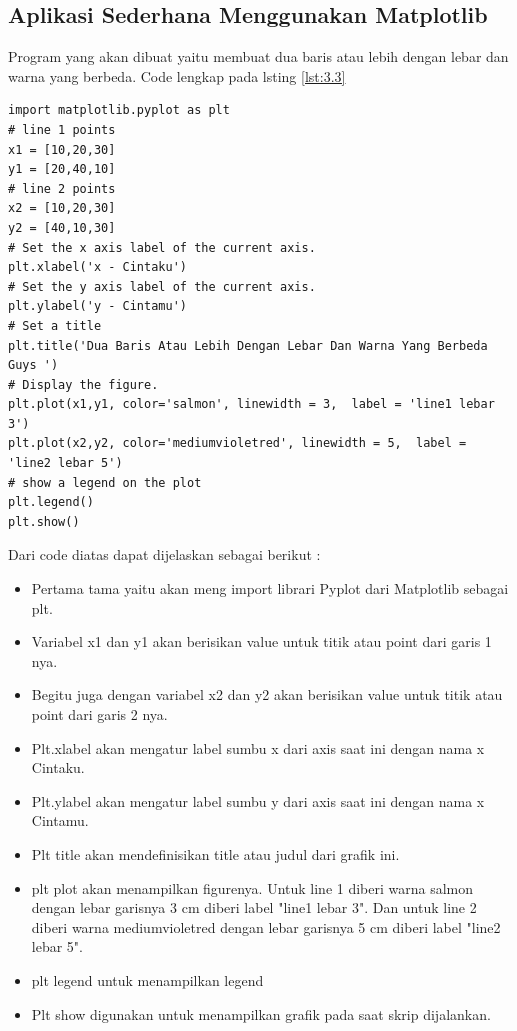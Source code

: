 \subsection{Aplikasi Sederhana Menggunakan Matplotlib}
Program yang akan dibuat yaitu membuat dua baris atau lebih dengan lebar dan warna yang berbeda. Code lengkap pada lsting \ref{lst:3.3}
\begin{lstlisting}[caption=Code Program Sederhana Matplotlib,label={lst:3.3}]
import matplotlib.pyplot as plt
# line 1 points
x1 = [10,20,30]
y1 = [20,40,10]
# line 2 points
x2 = [10,20,30]
y2 = [40,10,30]
# Set the x axis label of the current axis.
plt.xlabel('x - Cintaku')
# Set the y axis label of the current axis.
plt.ylabel('y - Cintamu')
# Set a title 
plt.title('Dua Baris Atau Lebih Dengan Lebar Dan Warna Yang Berbeda Guys ')
# Display the figure.
plt.plot(x1,y1, color='salmon', linewidth = 3,  label = 'line1 lebar 3')
plt.plot(x2,y2, color='mediumvioletred', linewidth = 5,  label = 'line2 lebar 5')
# show a legend on the plot
plt.legend()
plt.show()
\end{lstlisting}
Dari code diatas dapat dijelaskan sebagai berikut :\\
\begin{itemize}
\item
Pertama tama yaitu akan meng import librari Pyplot dari  Matplotlib sebagai plt.
\item
Variabel x1 dan y1 akan berisikan value untuk titik atau point dari garis 1 nya.
\item
Begitu juga dengan variabel x2 dan y2 akan berisikan value untuk titik atau point dari garis 2 nya.
\item
Plt.xlabel akan mengatur label sumbu x dari axis saat ini dengan nama x Cintaku.
\item
Plt.ylabel akan mengatur label sumbu y dari axis saat ini dengan nama x Cintamu.
\item
Plt title akan mendefinisikan title atau judul dari grafik ini.
\item
plt plot akan menampilkan figurenya. Untuk line 1 diberi warna salmon dengan lebar garisnya 3 cm diberi label "line1 lebar 3". Dan untuk  line 2 diberi warna mediumvioletred dengan lebar garisnya 5 cm diberi label "line2 lebar 5".
\item
plt legend untuk menampilkan legend 
\item
Plt show digunakan untuk menampilkan grafik pada saat skrip dijalankan.
\end{itemize}

